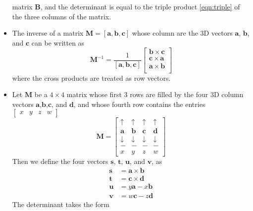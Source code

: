 \documentclass[11pt]{article}
\newcommand{\bm}[1]{\mathbf{#1}}
\begin{document}
\begin{itemize}
        matrix $\bm{B}$, and the determinant is equal to the triple product \eqref{eqn:triple} of the
        three columns of the matrix.
    \item The inverse of a matrix $\bm{M} = \bm{ \left[ a, b, c \right] }$
        whose column are the 3D vectors $\bm{a}$, $\bm{b}$, and $\bm{c}$ can be written as
        \begin{equation}
            \bm{M}^{-1} = \frac{1}{\left[ \bm{a}, \bm{b}, \bm{c} \right]}
            \begin{bmatrix}
                \bm{b} \times \bm{c} \\
                \bm{c} \times \bm{a} \\
                \bm{a} \times \bm{b} \\
            \end{bmatrix}
        \end{equation}
        where the cross products are treated as row vectors.
    \item Let $\bm{M}$ be a $4 \times 4$ matrix whose first 3 rows are filled by the
        four 3D column vectors $\bm{a}$,$\bm{b}$,$\bm{c}$, and $\bm{d}$, and whose
        fourth row contains the entries $\begin{bmatrix} x & y & z & w \end{bmatrix}$
        \begin{equation}
            \bm{M} =
            \begin{bmatrix}
                \uparrow & \uparrow & \uparrow & \uparrow \\
                \bm{a} & \bm{b} & \bm{c} & \bm{d} \\
                \downarrow & \downarrow & \downarrow & \downarrow \\
                - & - & - & - \\
                x & y & z & w
            \end{bmatrix}
        \end{equation}
        Then we define the four vectors $\bm{s}$, $\bm{t}$, $\bm{u}$, and $\bm{v}$, as
        \begin{align}
            \bm{s} &= \bm{a} \times \bm{b} \\
            \bm{t} &= \bm{c} \times \bm{d} \\
            \bm{u} &= y\bm{a} - x\bm{b} \\
            \bm{v} &= w\bm{c} - z\bm{d}
        \end{align}
        The determinant takes the form
        \begin{equation}

\end{equation}
\end{itemize}
\end{document}
